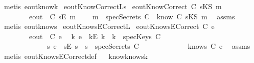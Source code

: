 \begin{isabellebody}
\ {\isacharparenleft}metis\ eout{\isacharunderscore}know{\isacharunderscore}k{\isacharparenright}%
\endisatagproof
{\isafoldproof}%
%
\isadelimproof
\isanewline
%
\endisadelimproof
\isanewline
{}\isamarkupfalse%
\ eoutKnowCorrect{\isacharunderscore}L{}s{\isacharcolon}\isanewline
{}\ {\isachardoublequoteopen}eoutKnowCorrect\ C\ {\isacharparenleft}sKS\ m{\isacharparenright}{\isachardoublequoteclose}\ \isanewline
\ \ \ \ \ \ \ \ {\isachardoublequoteopen}eout\ \ C\ {\isacharparenleft}sE\ m{\isacharparenright}{\isachardoublequoteclose}\isanewline
{}\ \ \ \ {\isachardoublequoteopen}m\ {\isasymin}\ {\isacharparenleft}specSecrets\ C{\isacharparenright}\ {\isasymor}\ {\isacharparenleft}know\ C\ {\isacharparenleft}sKS\ m{\isacharparenright}{\isacharparenright}{\isachardoublequoteclose}\ \isanewline
%
\isadelimproof
%
\endisadelimproof
%
\isatagproof
{}\isamarkupfalse%
\ assms\ \isamarkupfalse%
\ {\isacharparenleft}metis\ eout{\isacharunderscore}know{\isacharunderscore}s{\isacharparenright}%
\endisatagproof
{\isafoldproof}%
%
\isadelimproof
\isanewline
%
\endisadelimproof
\isanewline
{}\isamarkupfalse%
\ eoutKnowsECorrect{\isacharunderscore}L{}{\isacharcolon}\isanewline
{}\ {\isachardoublequoteopen}eoutKnowsECorrect\ C\ e{\isachardoublequoteclose}\ \isanewline
\ \ \ \ \ \ \ \ {\isachardoublequoteopen}eout\ \ C\ e{\isachardoublequoteclose}\isanewline
{}\ {\isachardoublequoteopen}{\isacharparenleft}{\isasymexists}\ k{\isachardot}\ e\ {\isacharequal}\ {\isacharparenleft}kE\ k{\isacharparenright}\ {\isasymand}\ {\isacharparenleft}k\ {\isasymin}\ specKeys\ C{\isacharparenright}{\isacharparenright}\ {\isasymor}\ \isanewline
\ \ \ \ \ \ \ \ \ \ \ \ {\isacharparenleft}{\isasymexists}\ s{\isachardot}\ e\ {\isacharequal}\ {\isacharparenleft}sE\ s{\isacharparenright}\ {\isasymand}\ {\isacharparenleft}s\ {\isasymin}\ specSecrets\ C{\isacharparenright}{\isacharparenright}\ {\isasymor}\isanewline
\ \ \ \ \ \ \ \ \ \ \ \ {\isacharparenleft}knows\ C\ {\isacharbrackleft}e{\isacharbrackright}{\isacharparenright}{\isachardoublequoteclose}\ \isanewline
%
\isadelimproof
%
\endisadelimproof
%
\isatagproof
{}\isamarkupfalse%
\ assms\ \isamarkupfalse%
\ {\isacharparenleft}metis\ eoutKnowsECorrect{\isacharunderscore}def{\isacharparenright}%
\endisatagproof
{\isafoldproof}%
%
\isadelimproof
\isanewline
%
\endisadelimproof
\ \isanewline
{}\isamarkupfalse%
\ know{}knows{\isacharunderscore}k{\isacharcolon}\ \isanewline

\end{isabellebody}
